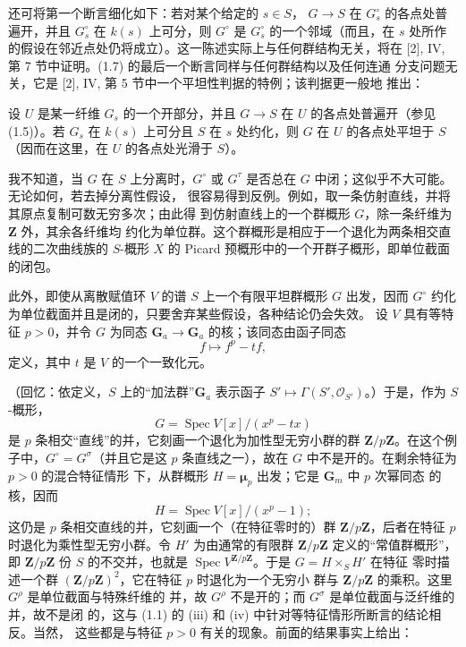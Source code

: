 还可将第一个断言细化如下：若对某个给定的 $s\in S$，
$G\longrightarrow S$ 在 $G_s^\circ$ 的各点处普遍开，并且 $G_s^\circ$ 在
$k(s)$ 上可分，则 $G^\circ$ 是 $G_s^\circ$ 的一个邻域（而且，在 $s$
处所作的假设在邻近点处仍将成立）。这一陈述实际上与任何群结构无关，将在
[2], IV, 第 7 节中证明。(1.7) 的最后一个断言同样与任何群结构以及任何连通
分支问题无关，它是 [2], IV, 第 5 节中一个平坦性判据的特例；该判据更一般地
推出：

 设 $U$ 是某一纤维 $G_s$ 的一个开部分，并且
$G\longrightarrow S$ 在 $U$ 的各点处普遍开（参见 (1.5)）。若 $G_s$ 在
$k(s)$ 上可分且 $S$ 在 $s$ 处约化，则 $G$ 在 $U$ 的各点处平坦于 $S$
（因而在这里，在 $U$ 的各点处光滑于 $S$）。

 我不知道，当 $G$ 在 $S$ 上分离时，$G^\circ$ 或
$G^\tau$ 是否总在 $G$ 中闭；这似乎不大可能。无论如何，若去掉分离性假设，
很容易得到反例。例如，取一条仿射直线，并将其原点复制可数无穷多次；由此得
到仿射直线上的一个群概形 $G$，除一条纤维为 $\mathbf Z$ 外，其余各纤维均
约化为单位群。这个群概形是相应于一个退化为两条相交直线的二次曲线族的
$S$-概形 $X$ 的 Picard 预概形中的一个开群子概形，即单位截面的闭包。

此外，即使从离散赋值环 $V$ 的谱 $S$ 上一个有限平坦群概形 $G$ 出发，因而
$G^\circ$ 约化为单位截面并且是闭的，只要舍弃某些假设，各种结论仍会失效。
设 $V$ 具有等特征 $p>0$，并令 $G$ 为同态
$\mathbf G_a\longrightarrow\mathbf G_a$ 的核；该同态由函子同态
\[
f\longmapsto f^p-tf,
\]
定义，其中 $t$ 是 $V$ 的一个一致化元。

（回忆：依定义，$S$ 上的“加法群”$\mathbf G_a$ 表示函子
$S'\longmapsto\Gamma(S',\mathcal O_{S'})$。）于是，作为 $S$-概形，
\[
G=\operatorname{Spec}V[x]/(x^p-tx)
\]
是 $p$ 条相交“直线”的并，它刻画一个退化为加性型无穷小群的群
$\mathbf Z/p\mathbf Z$。在这个例子中，$G^\circ=G^\sigma$（并且它是这
$p$ 条直线之一），故在 $G$ 中不是开的。在剩余特征为 $p>0$ 的混合特征情形
下，从群概形 $H=\symbf{\mu}_p$ 出发；它是 $\mathbf G_m$ 中 $p$ 次幂同态
的核，因而
\[
H=\operatorname{Spec}V[x]/(x^p-1) ;
\]
这仍是 $p$ 条相交直线的并，它刻画一个（在特征零时的）群
$\mathbf Z/p\mathbf Z$，后者在特征 $p$ 时退化为乘性型无穷小群。令 $H'$
为由通常的有限群 $\mathbf Z/p\mathbf Z$ 定义的“常值群概形”，即
$\mathbf Z/p\mathbf Z$ 份 $S$ 的不交并，也就是
$\operatorname{Spec}V^{\mathbf Z/p\mathbf Z}$。于是 $G=H\times_S H'$ 在特征
零时描述一个群 $(\mathbf Z/p\mathbf Z)^2$，它在特征 $p$ 时退化为一个无穷小
群与 $\mathbf Z/p\mathbf Z$ 的乘积。这里 $G^\rho$ 是单位截面与特殊纤维的
并，故 $G^\rho$ 不是开的；而 $G^\sigma$ 是单位截面与泛纤维的并，故不是闭
的，这与 (1.1) 的 (iii) 和 (iv) 中针对等特征情形所断言的结论相反。当然，
这些都是与特征 $p>0$ 有关的现象。前面的结果事实上给出：


